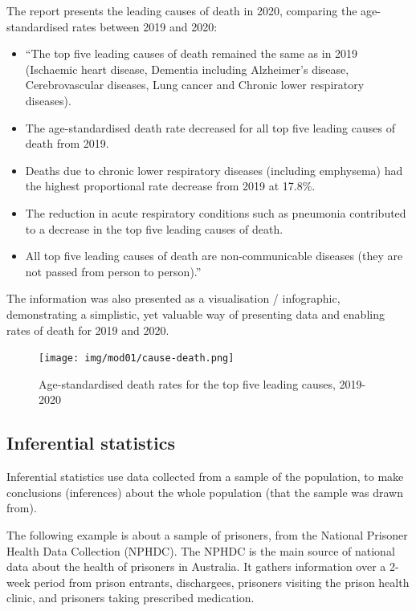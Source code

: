 \documentclass[
  a4paper,
]{memoir}
\providecommand{\tightlist}{%
  \setlength{\itemsep}{0pt}\setlength{\parskip}{0pt}}\usepackage{longtable,booktabs,array}
\begin{document}
The report presents the leading causes of death in 2020, comparing the
age-standardised rates between 2019 and 2020:

\begin{itemize}
\tightlist
\item
  ``The top five leading causes of death remained the same as in 2019
  (Ischaemic heart disease, Dementia including Alzheimer's disease,
  Cerebrovascular diseases, Lung cancer and Chronic lower respiratory
  diseases).
\item
  The age-standardised death rate decreased for all top five leading
  causes of death from 2019.
\item
  Deaths due to chronic lower respiratory diseases (including emphysema)
  had the highest proportional rate decrease from 2019 at 17.8\%.
\item
  The reduction in acute respiratory conditions such as pneumonia
  contributed to a decrease in the top five leading causes of death.
\item
  All top five leading causes of death are non-communicable diseases
  (they are not passed from person to person).''
\end{itemize}

The information was also presented as a visualisation / infographic,
demonstrating a simplistic, yet valuable way of presenting data and
enabling rates of death for 2019 and 2020.

\begin{figure}

{\centering \texttt{[image: img/mod01/cause-death.png]}

}

\caption{\label{fig-1-1}Age-standardised death rates for the top five
leading causes, 2019-2020}

\end{figure}

\hypertarget{inferential-statistics}{%
\subsection{Inferential statistics}\label{inferential-statistics}}

Inferential statistics use data collected from a sample of the
population, to make conclusions (inferences) about the whole population
(that the sample was drawn from).

The following example is about a sample of prisoners, from the National
Prisoner Health Data Collection (NPHDC). The NPHDC is the main source of
national data about the health of prisoners in Australia. It gathers
information over a 2-week period from prison entrants, dischargees,
prisoners visiting the prison health clinic, and prisoners taking
prescribed medication.
\end{document}

